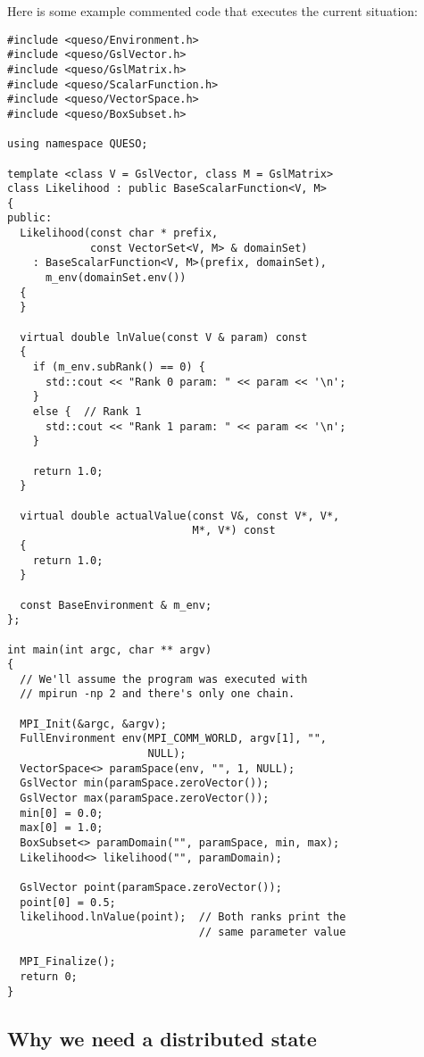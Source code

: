 \documentclass{article}
\begin{document}
Here is some example commented code that executes the current situation:
\begin{lstlisting}
#include <queso/Environment.h>
#include <queso/GslVector.h>
#include <queso/GslMatrix.h>
#include <queso/ScalarFunction.h>
#include <queso/VectorSpace.h>
#include <queso/BoxSubset.h>

using namespace QUESO;

template <class V = GslVector, class M = GslMatrix>
class Likelihood : public BaseScalarFunction<V, M>
{
public:
  Likelihood(const char * prefix,
             const VectorSet<V, M> & domainSet)
    : BaseScalarFunction<V, M>(prefix, domainSet),
      m_env(domainSet.env())
  {
  }

  virtual double lnValue(const V & param) const
  {
    if (m_env.subRank() == 0) {
      std::cout << "Rank 0 param: " << param << '\n';
    }
    else {  // Rank 1
      std::cout << "Rank 1 param: " << param << '\n';
    }

    return 1.0;
  }

  virtual double actualValue(const V&, const V*, V*,
                             M*, V*) const
  {
    return 1.0;
  }

  const BaseEnvironment & m_env;
};

int main(int argc, char ** argv)
{
  // We'll assume the program was executed with
  // mpirun -np 2 and there's only one chain.

  MPI_Init(&argc, &argv);
  FullEnvironment env(MPI_COMM_WORLD, argv[1], "",
                      NULL);
  VectorSpace<> paramSpace(env, "", 1, NULL);
  GslVector min(paramSpace.zeroVector());
  GslVector max(paramSpace.zeroVector());
  min[0] = 0.0;
  max[0] = 1.0;
  BoxSubset<> paramDomain("", paramSpace, min, max);
  Likelihood<> likelihood("", paramDomain);

  GslVector point(paramSpace.zeroVector());
  point[0] = 0.5;
  likelihood.lnValue(point);  // Both ranks print the
                              // same parameter value

  MPI_Finalize();
  return 0;
}
\end{lstlisting}

\subsection{Why we need a distributed state}
\end{document}
